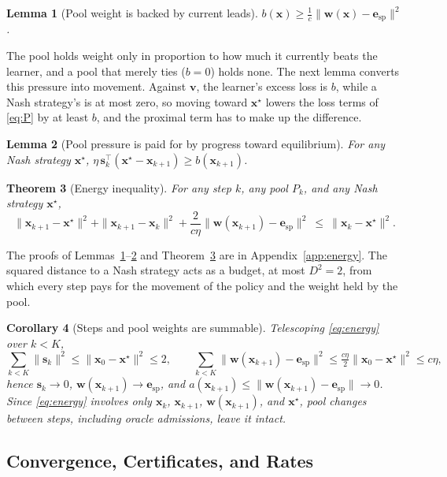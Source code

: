 \documentclass{article} %
\theoremstyle{plain}
\newtheorem{theorem}{Theorem}[section]
\newtheorem{lemma}[theorem]{Lemma}
\newtheorem{corollary}[theorem]{Corollary}
\theoremstyle{remark}
\newcommand{\bx}{{\bm{x}}}
\newcommand{\bv}{{\bm{v}}}
\newcommand{\bw}{{\bm{w}}}
\newcommand{\be}{{\bm{e}}}
\newcommand{\xs}{\bx^{\star}}
\newcommand{\dx}{{\bm{s}}}
\newcommand{\esp}{\be_{\mathrm{sp}}}
\begin{document}
\begin{lemma}[Pool weight is backed by current leads]
\label{lem:A}
$b(\bx)\ge\tfrac1c\|\bw(\bx)-\esp\|^2$.
\end{lemma}
The pool holds weight only in proportion to how much it currently beats the learner, and a pool that merely ties ($b=0$) holds none. The next lemma converts this pressure into movement. Against $\bv$, the learner's excess loss is $b$, while a Nash strategy's is at most zero, so moving toward $\xs$ lowers the loss terms of \eqref{eq:P} by at least $b$, and the proximal term has to make up the difference.

\begin{lemma}[Pool pressure is paid for by progress toward equilibrium]
\label{lem:B}
For any Nash strategy $\xs$, $\eta\,\dx_k^\top(\xs-\bx_{k+1})\ge b(\bx_{k+1})$.
\end{lemma}

\begin{theorem}[Energy inequality]
\label{thm:energy}
For any step $k$, any pool $P_k$, and any Nash strategy $\xs$,
\begin{equation}
\|\bx_{k+1}-\xs\|^2+\|\bx_{k+1}-\bx_k\|^2+\frac{2}{c\eta}\|\bw(\bx_{k+1})-\esp\|^2\ \le\ \|\bx_k-\xs\|^2 .
\label{eq:energy}
\end{equation}
\end{theorem}
The proofs of Lemmas~\ref{lem:A}--\ref{lem:B} and Theorem~\ref{thm:energy} are in Appendix~\ref{app:energy}. The squared distance to a Nash strategy acts as a budget, at most $D^2=2$, from which every step pays for the movement of the policy and the weight held by the pool.

\begin{corollary}[Steps and pool weights are summable]
\label{cor:sum}
Telescoping \eqref{eq:energy} over $k<K$,
\[
\textstyle\sum_{k<K}\|\dx_k\|^2\le\|\bx_0-\xs\|^2\le2,\qquad
\sum_{k<K}\|\bw(\bx_{k+1})-\esp\|^2\le\tfrac{c\eta}2\|\bx_0-\xs\|^2\le c\eta ,
\]
hence $\dx_k\to0$, $\bw(\bx_{k+1})\to \esp$, and $a(\bx_{k+1})\le\|\bw(\bx_{k+1})-\esp\|\to0$. Since \eqref{eq:energy} involves only $\bx_k$, $\bx_{k+1}$, $\bw(\bx_{k+1})$, and $\xs$, pool changes between steps, including oracle admissions, leave it intact.
\end{corollary}

\subsection{Convergence, Certificates, and Rates}
\label{sec:conv}
\end{document}
